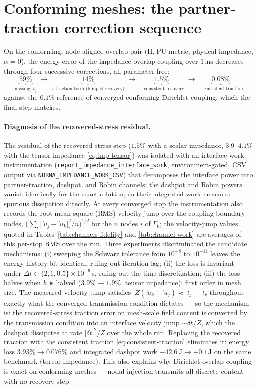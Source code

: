 \documentclass[11pt]{article}
\newcommand{\code}[1]{\texttt{#1}}
\begin{document}
\section{Conforming meshes: the partner-traction correction sequence}
\label{sec:ladder}

On the conforming, node-aligned overlap pair (II, PU metric, physical
impedance, $\alpha = 0$), the energy error of the impedance overlap coupling
over $1$\,ms decreases through four successive corrections, all
parameter-free:
\[
  \underbrace{59\%}_{\text{missing } ~t_j}
  \;\longrightarrow\;
  \underbrace{14\%}_{+\,\text{traction term (lumped recovery)}}
  \;\longrightarrow\;
  \underbrace{1.5\%}_{+\,\text{consistent recovery}}
  \;\longrightarrow\;
  \underbrace{0.08\%}_{+\,\text{consistent traction}}
\]
against the $0.1\%$ reference of converged conforming Dirichlet coupling,
which the final step matches.

\paragraph{Diagnosis of the recovered-stress residual.} The residual of
the recovered-stress step ($1.5\%$ with a scalar impedance,
$3.9$--$4.1\%$ with the tensor impedance \eqref{eq:imp-tensor}) was
isolated with an interface-work
instrumentation (\code{report\_impedance\_interface\_work}, environment-gated,
CSV output via \code{NORMA\_IMPEDANCE\_WORK\_CSV}) that decomposes the
interface power into partner-traction, dashpot, and Robin channels; the
dashpot and Robin powers vanish identically for the exact solution, so their
integrated work measures spurious dissipation directly. At every converged
stop the instrumentation also records the root-mean-square (RMS) velocity
jump over the coupling-boundary nodes,
$\bigl( \sum_i \lvert \dot{~u}_j - \dot{~u}_k \rvert_i^2 / n
\bigr)^{1/2}$ for the $n$ nodes $i$ of $\Gamma_k$; the velocity-jump
values quoted in Tables~\ref{tab:channels-fidelity} and
\ref{tab:channel-work} are averages of this per-stop RMS over the run.
Three experiments
discriminated the candidate mechanisms: (i) sweeping the Schwarz tolerance
from $10^{-8}$ to $10^{-11}$ leaves the energy history bit-identical, ruling
out iteration lag; (ii) the loss is invariant under
$\Delta t \in \{2, 1, 0.5\} \times 10^{-6}$\,s, ruling out the time
discretization; (iii) the loss halves when $h$ is halved
($3.9\% \to 1.9\%$, tensor impedance): first order in mesh size. The measured velocity jump
satisfies $~Z(\dot{~u}_k - \dot{~u}_j) \approx ~t_j - ~t_k$ throughout ---
exactly what the converged transmission condition dictates --- so the
mechanism is: the recovered-stress traction error on mesh-scale field
content is converted by the transmission condition into an interface
velocity jump $\sim \delta t/Z$, which the dashpot dissipates at rate
$\lvert \delta t \rvert^2/Z$ over the whole run. Replacing the recovered
traction with the consistent traction \eqref{eq:consistent-traction}
eliminates it: energy loss $3.93\% \to 0.076\%$ and integrated dashpot work
$-42.6\,\mathrm{J} \to +0.1\,\mathrm{J}$ on the same benchmark (tensor
impedance). This also
explains why Dirichlet overlap coupling is exact on conforming meshes ---
nodal injection transmits all discrete content with no recovery step.
\end{document}
